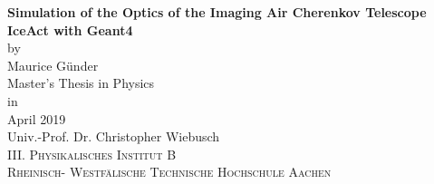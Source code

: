 \begin{titlepage}
\addtolength{\oddsidemargin}{4mm}
\begin{center}

\LARGE
\textbf{Simulation of the Optics of the Imaging Air Cherenkov Telescope IceAct with Geant4} \\[15mm]

{\large by}\\[1mm]
\Large
Maurice Günder\\[18mm]

Master's Thesis in Physics\\[70mm]

{\large in}\\[1mm]
April 2019\\[35mm]

Univ.-Prof. Dr. Christopher Wiebusch \\\textsc{III. Physikalisches Institut B \\Rheinisch- Westfälische Technische Hochschule Aachen}

\end{center}
\end{titlepage}